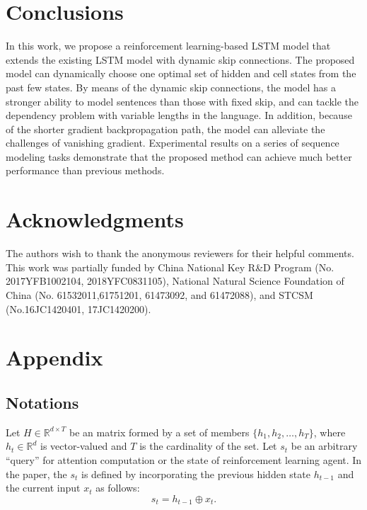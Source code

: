 \documentclass[letterpaper]{article} \usepackage{aaai19}  \usepackage{times}  \usepackage{helvet}  \usepackage{courier}  \usepackage{url}  \usepackage{graphicx}  \usepackage{amsmath}
\begin{document}
\section{Conclusions}
In this work, we propose a reinforcement learning-based LSTM model that extends the existing LSTM model with dynamic skip connections. The proposed model can dynamically choose one optimal set of hidden and cell states from the past few states. By means of the dynamic skip connections, the model has a stronger ability to model sentences than those with fixed skip, and can tackle the dependency problem with variable lengths in the language. In addition, because of the shorter gradient backpropagation path, the model can alleviate the challenges of vanishing gradient. Experimental results on a series of sequence modeling tasks demonstrate that the proposed method can achieve much better performance than previous methods.


\section{Acknowledgments}
The authors wish to thank the anonymous reviewers for their helpful comments. This work was partially funded by China National Key R\&D Program (No. 2017YFB1002104, 2018YFC0831105), National Natural Science Foundation of China (No. 61532011,61751201, 61473092, and 61472088), and STCSM (No.16JC1420401, 17JC1420200).

\section{Appendix}

\subsection{Notations}
Let $H \in \mathbb{R}^{d\times T}$ be an matrix formed by a set of members $\{h_1, h_2, \dots, h_T \}$, where $h_t \in \mathbb{R}^d$ is vector-valued and $T$ is the cardinality of the set. Let $s_t$ be an arbitrary ``query'' for attention computation or the state of reinforcement learning agent. In the paper, the $s_t$ is defined by incorporating the previous hidden state $h_{t-1}$ and the current input ${x_t}$ as follows:
$$s_t = h_{t-1} \oplus x_t.$$
\end{document}
